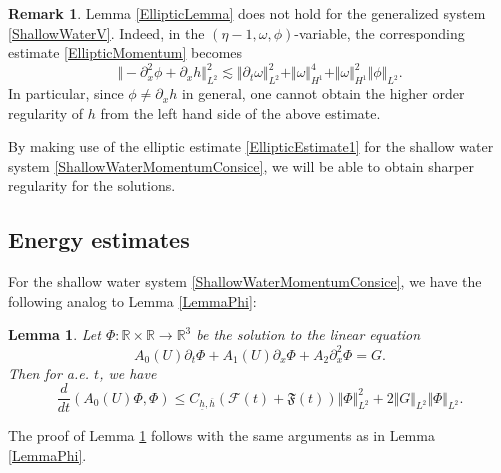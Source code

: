 \documentclass[reqno,11pt]{amsart}
\newcommand{\norm}[2]{\Vert #1 \Vert_{#2}}
\theoremstyle{plain}
\newtheorem{lemma}[theorem]{Lemma}
\theoremstyle{definition}
\newtheorem{remark}[theorem]{Remark}
\numberwithin{equation}{section}
\begin{document}
\begin{remark}
\label{rm:non-elliptic-est-general-sys}
    Lemma \ref{EllipticLemma} does not hold for the generalized system \eqref{ShallowWaterV}. Indeed, in the $(\eta-1,\omega,\phi)$-variable, the corresponding estimate \eqref{EllipticMomentum} becomes 
    \[
    \norm{-\partial_x^2 \phi+\partial_x h}{L^2}^2 \lesssim \norm{\partial_t \omega}{L^2}^2+\norm{\omega}{H^1}^4+\norm{\omega}{H^1}^2\norm{\phi}{L^2}.
    \]
    In particular, since $ \phi \neq \partial_x h $ in general, one cannot obtain the higher order regularity of $ h $ from the left hand side of the above estimate.

    By making use of the elliptic estimate \eqref{EllipticEstimate1} for the shallow water system \eqref{ShallowWaterMomentumConsice}, we will be able to obtain sharper regularity for the solutions.
    
\end{remark}
\subsection{Energy estimates} For the shallow water system \eqref{ShallowWaterMomentumConsice}, we have the following analog to Lemma \ref{LemmaPhi}:
\begin{lemma}
\label{EnergyOriginal}
    Let $\Phi:\mathbb R \times\mathbb R\to\mathbb{R}^3$ be the solution to the linear equation
    \[
    A_0(U)\partial_t \Phi +A_1(U)\partial_x \Phi+A_2 \partial_x^2 \Phi=G.
    \]
    Then for a.e. $t$, we have
    \begin{equation}
        \frac{d}{dt} (A_0(U)\Phi,\Phi)\leq C_{\underline{h},\overline{h}} ( \mathcal{F}(t) + \mathfrak F(t) ) \norm{\Phi}{L^2}^2+2\norm{G}{L^2} \norm{\Phi}{L^2}.
    \end{equation}
\end{lemma}
The proof of Lemma \ref{EnergyOriginal} follows with the same arguments as in Lemma \ref{LemmaPhi}.
\end{document}
